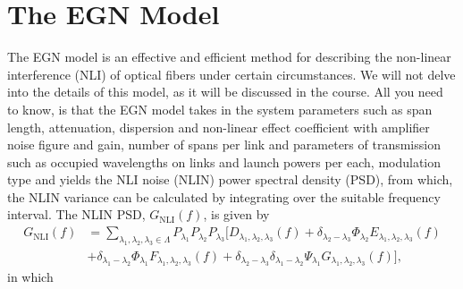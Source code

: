 \documentclass[10pt,letterpaper]{article}
\begin{document}
\section{The EGN Model}
The EGN model is an effective and efficient method for describing the non-linear interference (NLI) of optical fibers under certain circumstances. We will not delve into the details of this model, as it will be discussed in the course. All you need to know, is that the EGN model takes in the system parameters such as span length, attenuation, dispersion and non-linear effect coefficient with amplifier noise figure and gain, number of spans per link and parameters of transmission such as occupied wavelengths on links and launch powers per each, modulation type and yields the NLI noise (NLIN) power spectral density (PSD), from which, the NLIN variance can be calculated by integrating over the suitable frequency interval. The NLIN PSD, $G_\text{NLI}(f)$, is given by
\begin{equation}
\begin{split}
       G_\text{NLI}(f)&=
	\!\!\!\!\!\!
        \sum_{
        \lambda_1,\lambda_2,\lambda_3\in \Lambda
        }
       \!\!\!\!\!\!
        P_{\lambda_1}P_{\lambda_2}P_{\lambda_3}
        \Big[
        D_{\lambda_1,\lambda_2,\lambda_3}(f)+
        \delta_{\lambda_2-\lambda_3}\Phi_{\lambda_2}E_{\lambda_1,\lambda_2,\lambda_3}(f)
\\&+
        \delta_{\lambda_1-\lambda_2}\Phi_{\lambda_1}F_{\lambda_1,\lambda_2,\lambda_3}(f)+
        \delta_{\lambda_2-\lambda_3}
        \delta_{\lambda_1-\lambda_2}
        \Psi_{\lambda_1}G_{\lambda_1,\lambda_2,\lambda_3}(f)
        \Big],
	\label{gnli.main}
\end{split}
\end{equation}
in which
\end{document}
